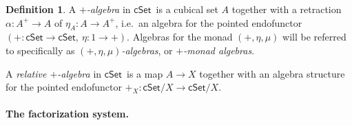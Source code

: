 \documentclass[12pt]{article}
\newcommand{\cSet}{\ensuremath{\mathsf{cSet}}}
\newcommand{\ra}{\ensuremath{\rightarrow}}
\theoremstyle{remark}
\theoremstyle{definition}
\newtheorem{definition}[theorem]{Definition}
\begin{document}
\begin{definition}\label{def:+alg}
A \emph{$+$-algebra} in \cSet\ is a cubical set $A$ together with a retraction $\alpha : A^+\ra A$ of $\eta_A : A \ra A^+$, i.e.\ an algebra for the pointed endofunctor $(+ : \cSet\ra \cSet,\ \eta : 1 \ra +)$.  Algebras for the monad $(+, \eta, \mu)$ will be referred to specifically as \emph{$(+, \eta, \mu)$-algebras}, or \emph{$+$-monad algebras}. 

A \emph{relative $+$-algebra} in \cSet\ is a map $A \ra X$ together with an algebra structure for the pointed endofunctor $+_X : \cSet/X \ra \cSet/X$.
\end{definition}

\paragraph{The factorization system.}
\end{document}
